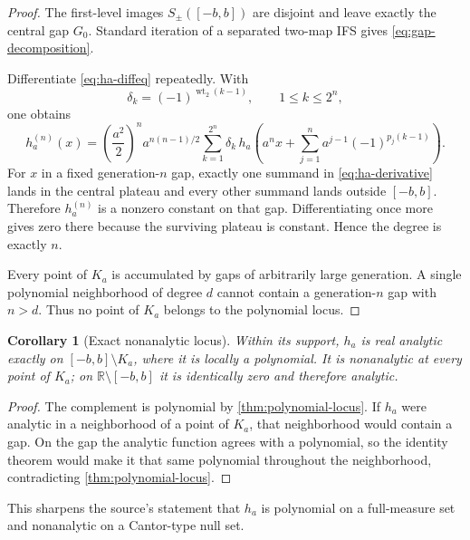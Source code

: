 \documentclass[11pt,oneside]{article}
\newtheorem{corollary}[theorem]{Corollary}
\theoremstyle{definition}
\theoremstyle{remark}
\newcommand{\R}{\mathbb R}
\newcommand{\wt}{\operatorname{wt}_2}
\begin{document}
\begin{proof}
The first-level images $S_\pm([-b,b])$ are disjoint and leave exactly the central gap $G_0$.
Standard iteration of a separated two-map IFS gives \eqref{eq:gap-decomposition}.

Differentiate \eqref{eq:ha-diffeq} repeatedly.  With
\begin{equation}
 \delta_k=(-1)^{\wt(k-1)},\qquad 1\le k\le2^n,
 \label{eq:delta-TM}
\end{equation}
one obtains
\begin{equation}
 h_a^{(n)}(x)=
 \left(\frac{a^2}{2}\right)^n a^{n(n-1)/2}
 \sum_{k=1}^{2^n}\delta_k\,
 h_a\!\left(a^nx+\sum_{j=1}^{n}a^{j-1}(-1)^{p_j(k-1)}\right).
 \tag{S3.49}
 \label{eq:ha-derivative}
\end{equation}
For $x$ in a fixed generation-$n$ gap, exactly one summand in
\eqref{eq:ha-derivative} lands in the central plateau and every other summand lands outside
$[-b,b]$.  Therefore $h_a^{(n)}$ is a nonzero constant on that gap.  Differentiating once
more gives zero there because the surviving plateau is constant.  Hence the degree is
exactly $n$.

Every point of $K_a$ is accumulated by gaps of arbitrarily large generation.  A single
polynomial neighborhood of degree $d$ cannot contain a generation-$n$ gap with $n>d$.
Thus no point of $K_a$ belongs to the polynomial locus.
\end{proof}

\begin{corollary}[Exact nonanalytic locus]
\label{cor:nonanalytic-locus}
Within its support, $h_a$ is real analytic exactly on $[-b,b]\setminus K_a$, where it is
locally a polynomial.  It is nonanalytic at every point of $K_a$; on
$\R\setminus[-b,b]$ it is identically zero and therefore analytic.
\end{corollary}

\begin{proof}
The complement is polynomial by \cref{thm:polynomial-locus}.  If $h_a$ were analytic in a
neighborhood of a point of $K_a$, that neighborhood would contain a gap.  On the gap the
analytic function agrees with a polynomial, so the identity theorem would make it that same
polynomial throughout the neighborhood, contradicting \cref{thm:polynomial-locus}.
\end{proof}

This sharpens the source's statement that $h_a$ is polynomial on a full-measure set and
nonanalytic on a Cantor-type null set.
\end{document}
